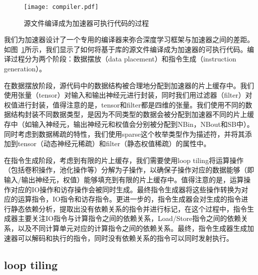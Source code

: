 \begin{figure}[h]

\centering
\texttt{[image: compiler.pdf]}
\caption{源文件编译成为加速器可执行代码的过程}
\label{fig:compiler}
\end{figure}

我们为加速器设计了一个专用的编译器来弥合深度学习框架与加速器之间的差距。如图~\ref{fig:compiler}所示，我们显示了如何将基于库的源文件编译成为加速器的可执行代码。编译过程分为两个阶段：数据摆放（data placement）和指令生成（instruction generation）。

在数据摆放阶段，源代码中的数据结构被合理地分配到加速器的片上缓存中。我们使用张量（tensor）对输入和输出神经元进行封装，同时我们用过滤器（filter）对权值进行封装，值得注意的是，tensor和filter都是四维的张量。我们使用不同的数据结构封装不同数据类型，是因为不同类型的数据会被分配到加速器不同的片上缓存中（如输入神经元，输出神经元和权值会分别被分配到NBin，NBout和SB中）。同时考虑到数据稀疏的特性，我们使用sparse这个枚举类型作为描述符，并将其添加到tensor（动态神经元稀疏）和filter（静态权值稀疏）的属性中。

在指令生成阶段，考虑到有限的片上缓存，我们需要使用loop tiling将运算操作（包括卷积操作，池化操作等）分解为子操作，以确保子操作对应的数据能够（即输入/输出神经元，权值）能够填充到有限的片上缓存中。值得注意的是，运算操作对应的IO操作和访存操作会被同时生成。最终指令生成器将这些操作转换为对应的运算指令，IO指令和访存指令。更进一步的，指令生成器会对生成的指令进行静态依赖分析，提取出没有依赖关系的指令并进行标记，在这个过程中，指令生成器主要关注IO指令与计算指令之间的依赖关系，Load/Store指令之间的依赖关系，以及不同计算单元对应的计算指令之间的依赖关系。最终，指令生成器生成加速器可以解码和执行的指令，同时没有依赖关系的指令可以同时发射执行。

\subsection{loop tiling}

